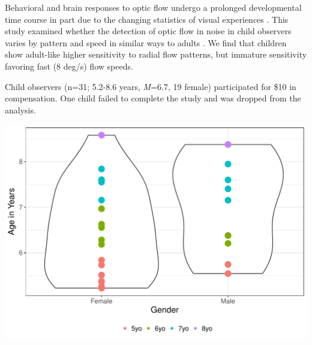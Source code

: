 \documentclass[landscape,final,paperwidth=60in,paperheight=40in,fontscale=0.285]{baposter}
\begin{document}
\begin{poster}
%
    {
      Behavioral and brain responses to optic flow undergo a prolonged developmental time course \cite{gilmore_childrens_2016, fesi_cortical_2014} in part due to the changing statistics of visual experiences \cite{gilmore_what_2015,raudies_visual_2014}. This study examined whether the detection of optic flow in noise in child observers varies by pattern and speed in similar ways to adults \cite{adamiak_adult_2015}. We find that children show adult-like higher sensitivity to radial flow patterns, but immature sensitivity favoring fast (8 deg/s) flow speeds.
    }
    {
\par Child observers (n=31; 5.2-8.6 years, \emph{M}=6.7, 19 female) participated for \$10 in compensation. One child failed to complete the study and was dropped from the analysis.
\begin{center}
\includegraphics[scale=0.4]{img/age-sex-violin-1.pdf}

\end{center}}
\end{poster}
\end{document}
